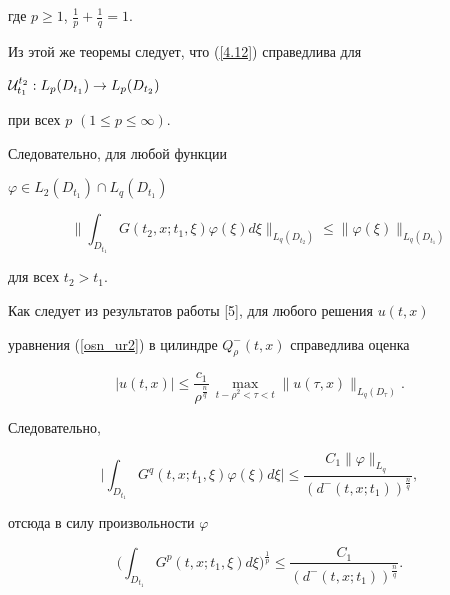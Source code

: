 где $p \geq 1$, $\frac{1}{p}+\frac{1}{q}=1$.





Из этой же теоремы следует, что (\ref{4.12}) справедлива для 


${\cal U}_{t_1}^{t_2}:L_p(D_{t_1})\to L_p(D_{t_2})$


при всех $p$ $(1\leq p \leq \infty)$.


Следовательно, для любой функции 


$\varphi \in L_2(D_{t_1})\cap L_q(D_{t_1})$


$$


\bigg\|\int_{D_{t_1}}G(t_2,x;t_1,\xi)\varphi(\xi)d\xi


\bigg\|_{L_q(D_{t_2})} \leq \|\varphi(\xi)\|_{L_q(D_{t_1})}


$$


для всех $t_2>t_1$.





Как следует из результатов работы [5], для любого решения $u(t,x)$


уравнения (\ref{osn_ur2}) в цилиндре $Q_\rho^- (t,x)$ справедлива оценка


\begin{equation}


|u(t,x)|\leq \frac{c_1}{\rho^{\frac{n}{q}}}\,


\max\limits_{t-\rho^2<\tau<t}\|u(\tau,x)\|_{L_q(D_\tau)}.


\label{4.14}


\end{equation} 


Следовательно,


$$




\bigg|\int_{D_{t_1}} G^q(t,x;t_1,\xi)\varphi(\xi) d\xi \bigg|\leq


\frac{C_1 \|\varphi\|_{L_q}}{(d^{-}(t,x;t_1))^{\frac{n}{q}}},\label{37}




$$


отсюда в силу произвольности $\varphi$


\begin{equation}


\bigg(\int_{D_{t_1}} G^p(t,x;t_1,\xi)d\xi\bigg)^{\frac{1}{p}}\leq


\frac{C_1}{(d^{-}(t,x;t_1))^{\frac{n}{q}}} .


\label{4.15}


\end{equation}


